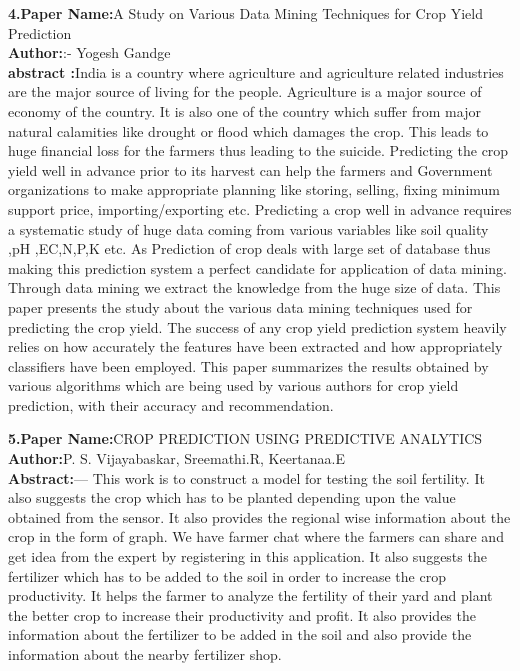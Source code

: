 \documentclass[oneside,a4paper,12pt]{report}
\begin{document}
\item \textbf{4.Paper Name:}A Study on Various Data Mining Techniques for 
Crop Yield Prediction \\
\textbf{Author:}:- Yogesh Gandge \\
\textbf{abstract :}India is a country where agriculture and agriculture 
related industries are the major source of living for the people. 
Agriculture is a major source of economy of the country. It is also 
one of the country which suffer from major natural calamities like 
drought or flood which damages the crop. This leads to huge 
financial loss for the farmers thus leading to the suicide. Predicting 
the crop yield well in advance prior to its harvest can help the 
farmers and Government organizations to make appropriate 
planning like storing, selling, fixing minimum support price, 
importing/exporting etc. Predicting a crop well in advance requires 
a systematic study of huge data coming from various variables like 
soil quality ,pH ,EC,N,P,K etc. As Prediction of crop deals with 
large set of database thus making this prediction system a perfect 
candidate for application of data mining. Through data mining we 
extract the knowledge from the huge size of data. This paper 
presents the study about the various data mining techniques used 
for predicting the crop yield. The success of any crop yield 
prediction system heavily relies on how accurately the features have 
been extracted and how appropriately classifiers have been 
employed. This paper summarizes the results obtained by various 
algorithms which are being used by various authors for crop yield 
prediction, with their accuracy and recommendation.\\

\newpage

\item \textbf{5.Paper Name:}CROP PREDICTION USING PREDICTIVE 
ANALYTICS\\
\textbf{Author:}P. S. Vijayabaskar, Sreemathi.R, Keertanaa.E \\
\textbf{Abstract:}— This work is to construct a model for testing the 
soil fertility. It also suggests the crop which has to be planted 
depending upon the value obtained from the sensor. It also 
provides the regional wise information about the crop in the form 
of graph. We have farmer chat where the farmers can share and 
get idea from the expert by registering in this application. It also 
suggests the fertilizer which has to be added to the soil in order to 
increase the crop productivity. It helps the farmer to analyze the 
fertility of their yard and plant the better crop to increase their 
productivity and profit. It also provides the information about 
the fertilizer to be added in the soil and also provide the 
information about the nearby fertilizer shop.  \\
\end{document}
